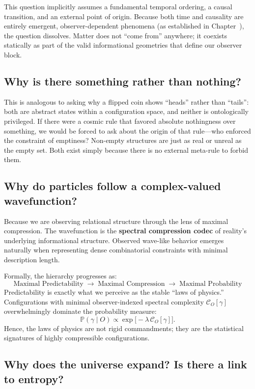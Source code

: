This question implicitly assumes a fundamental temporal ordering, a causal transition, and an external point of origin.
Because both time and causality are entirely emergent, observer-dependent phenomena (as established in Chapter~), the question dissolves.
Matter does not ``come from'' anywhere; it coexists statically as part of the valid informational geometries that define our observer block.


\subsection*{Why is there something rather than nothing?}

This is analogous to asking why a flipped coin shows ``heads'' rather than ``tails'': both are abstract states within a configuration space, and neither is ontologically privileged.
If there were a cosmic rule that favored absolute nothingness over something, we would be forced to ask about the origin of that rule—who enforced the constraint of emptiness? Non-empty structures are just as real or unreal as the empty set.
Both exist simply because there is no external meta-rule to forbid them.


\subsection*{Why do particles follow a complex-valued wavefunction?}

Because we are observing relational structure through the lens of maximal compression.
The wavefunction is the \textbf{spectral compression codec} of reality's underlying informational structure.
Observed wave-like behavior emerges naturally when representing dense combinatorial constraints with minimal description length.

Formally, the hierarchy progresses as:
\[
\boxed{\text{Maximal Predictability}} \;\rightarrow\; \boxed{\text{Maximal Compression}} \;\rightarrow\; \boxed{\text{Maximal Probability}} 
\]
Predictability is exactly what we perceive as the stable ``laws of physics.''
Configurations with minimal observer-indexed spectral complexity $\mathcal{C}_O[\gamma]$ overwhelmingly dominate the probability measure:
\[
\mathbb{P}(\gamma \mid O) \propto \exp\bigl[-\lambda \, \mathcal{C}_O[\gamma]\bigr].
\]
Hence, the laws of physics are not rigid commandments; they are the statistical signatures of highly compressible configurations.


\subsection*{Why does the universe expand? Is there a link to entropy?}

